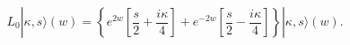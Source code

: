 \begin{equation}
L_0|\kappa,s\rangle(w)
=\left\{e^{2w}\left[\frac{s}{2}+\frac{i\kappa}{4}\right]
+e^{-2w}\left[\frac{s}{2}-\frac{i\kappa}{4}\right]
\right\}|\kappa,s\rangle(w).
\label{A2}
\end{equation}

